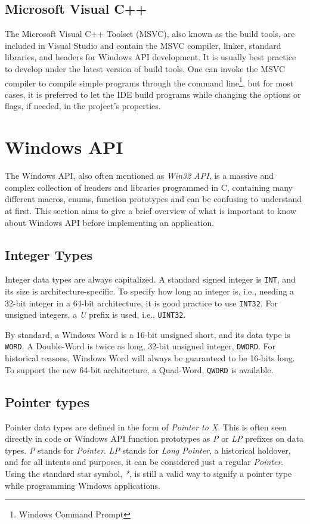 \subsection{Microsoft Visual C++}
\label{ch2msvc}
The Microsoft Visual C++ Toolset (MSVC), also known as the build tools, are included in Visual Studio and contain the MSVC compiler, linker, standard libraries, and headers for Windows API development. It is usually best practice to develop under the latest version of build tools. One can invoke the MSVC compiler to compile simple programs through the command line\footnote{Windows Command Prompt}, but for most cases, it is preferred to let the IDE build programs while changing the options or flags, if needed, in the project's properties.\cite{MsVc}


\section{Windows API}
The Windows API, also often mentioned as \textit{Win32 API}, is a massive and complex collection of headers and libraries programmed in C, containing many different macros, enums, function prototypes and can be confusing to understand at first. This section aims to give a brief overview of what is important to know about Windows API before implementing an application.

\subsection{Integer Types}
\label{winIntegers}
Integer data types are always capitalized. A standard signed integer is \lstinline{INT}, and its size is architecture-specific. To specify how long an integer is, i.e., needing a 32-bit integer in a 64-bit architecture, it is good practice to use \lstinline{INT32}. For unsigned integers, a \textit{U} prefix is used, i.e., \lstinline{UINT32}.

By standard, a Windows Word is a 16-bit unsigned short, and its data type is \lstinline{WORD}. A Double-Word is twice as long, 32-bit unsigned integer,  \lstinline{DWORD}. For historical reasons, Windows Word will always be guaranteed to be 16-bits long. To support the new 64-bit architecture, a Quad-Word, \lstinline{QWORD} is available.

\subsection{Pointer types}
Pointer data types are defined in the form of \textit{Pointer to X}. This is often seen directly in code or Windows API function prototypes as \textit{P} or \textit{LP} prefixes on data types. \textit{P} stands for \textit{Pointer}. \textit{LP} stands for \textit{Long Pointer}, a historical holdover, and for all intents and purposes, it can be considered just a regular \textit{Pointer}. Using the standard star symbol, \textit{*}, is still a valid way to signify a pointer type while programming Windows applications.

